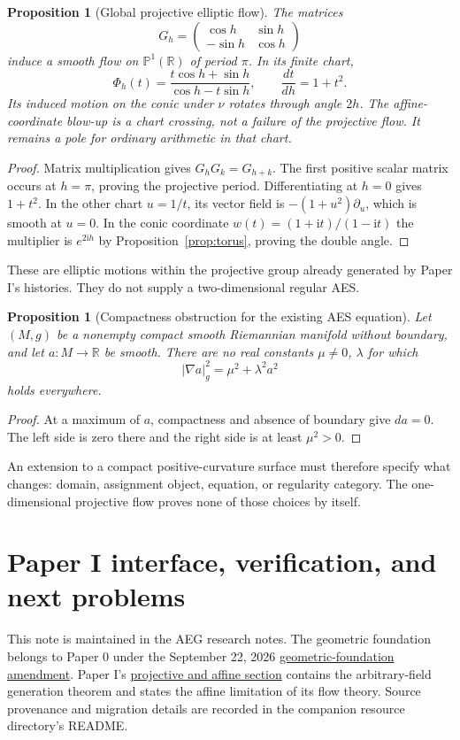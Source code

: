 \documentclass[11pt]{article}
\newtheorem{proposition}[theorem]{Proposition}
\theoremstyle{definition}
\theoremstyle{remark}
\newcommand{\R}{\mathbb R}
\newcommand{\PP}{\mathbb P}
\newcommand{\ii}{\mathrm i}
\begin{document}
\begin{proposition}[Global projective elliptic flow]\label{prop:real-flow}
The matrices
\[
 G_h=\begin{pmatrix}\cos h&\sin h\\-\sin h&\cos h\end{pmatrix}
\]
induce a smooth flow on $\PP^1(\R)$ of period $\pi$. In its finite chart,
\[
 \Phi_h(t)=\frac{t\cos h+\sin h}{\cos h-t\sin h},\qquad
 \frac{dt}{dh}=1+t^2.
\]
Its induced motion on the conic under $\nu$ rotates through angle $2h$.
The affine-coordinate blow-up is a chart crossing, not a failure of the
projective flow. It remains a pole for ordinary arithmetic in that chart.
\end{proposition}
\begin{proof}
Matrix multiplication gives $G_hG_k=G_{h+k}$. The first positive scalar
matrix occurs at $h=\pi$, proving the projective period. Differentiating at
$h=0$ gives $1+t^2$. In the other chart $u=1/t$, its vector field is
$-(1+u^2)\partial_u$, which is smooth at $u=0$. In the conic coordinate
$w(t)=(1+\ii t)/(1-\ii t)$ the multiplier is $e^{2\ii h}$ by
Proposition~\ref{prop:torus}, proving the double angle.
\end{proof}

These are elliptic motions within the projective group already generated by
Paper I's histories. They do not supply a two-dimensional regular AES.
\begin{proposition}[Compactness obstruction for the existing AES equation]
\label{prop:compact}
Let $(M,g)$ be a nonempty compact smooth Riemannian manifold without boundary,
and let $a:M\to\R$ be smooth. There are no real constants $\mu\ne0$, $\lambda$
for which
\[
 |\nabla a|_g^2=\mu^2+\lambda^2a^2
\]
holds everywhere.
\end{proposition}
\begin{proof}
At a maximum of $a$, compactness and absence of boundary give $da=0$.
The left side is zero there and the right side is at least $\mu^2>0$.
\end{proof}
An extension to a compact positive-curvature surface must therefore specify
what changes: domain, assignment object, equation, or regularity category.
The one-dimensional projective flow proves none of those choices by itself.

\section{Paper I interface, verification, and next problems}
This note is maintained in the AEG research notes. The geometric foundation
belongs to Paper 0 under the September 22, 2026
\href{../../governance/00b-paper-0-geometric-foundation-amendment.md}{geometric-foundation amendment}.
Paper I's \href{../../paper-1/sections/03-projective-affine.tex}{projective and affine section} contains the
arbitrary-field generation theorem and states the affine limitation of its
flow theory. Source provenance and migration details are recorded in the
companion resource directory's README.
\end{document}
